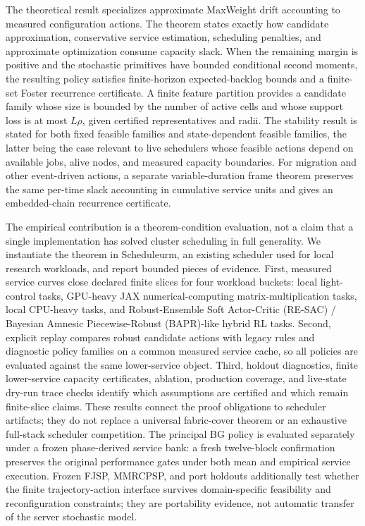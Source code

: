 \documentclass[opre,dblanonrev]{informs4}
\begin{document}
The theoretical result specializes approximate MaxWeight drift accounting to
measured configuration actions.  The theorem states exactly how candidate
approximation, conservative service estimation, scheduling penalties, and
approximate optimization consume capacity slack.  When the remaining margin is
positive and the stochastic primitives have bounded conditional second moments,
the resulting policy satisfies finite-horizon expected-backlog bounds and a
finite-set Foster recurrence certificate.  A finite feature partition provides
a candidate family whose size is bounded by the number of active cells and
whose support loss is at most \(L\rho\), given certified representatives and
radii.  The stability result is
stated for both fixed feasible families and state-dependent feasible families,
the latter being the case relevant to live schedulers whose feasible actions
depend on available jobs, alive nodes, and measured capacity boundaries.
For migration and other event-driven actions, a separate variable-duration
frame theorem preserves the same per-time slack accounting in cumulative
service units and gives an embedded-chain recurrence certificate.

The empirical contribution is a theorem-condition evaluation, not a claim that a
single implementation has solved cluster scheduling in full generality.  We
instantiate the theorem in Scheduleurm, an existing scheduler used for local
research workloads, and report bounded pieces of evidence.  First, measured
service curves close declared finite slices for four workload buckets: local
light-control tasks, GPU-heavy JAX numerical-computing matrix-multiplication
tasks, local CPU-heavy tasks, and Robust-Ensemble Soft Actor-Critic (RE-SAC) /
Bayesian Amnesic Piecewise-Robust (BAPR)-like hybrid RL tasks.  Second,
explicit replay compares robust candidate actions with legacy rules and
diagnostic policy families on a common measured service cache, so all policies
are evaluated against the same lower-service object.  Third, holdout
diagnostics, finite lower-service capacity certificates, ablation, production
coverage, and live-state dry-run trace checks identify which assumptions are
certified and which remain finite-slice claims.  These results connect the
proof obligations to scheduler artifacts; they do not replace a universal
fabric-cover theorem or an exhaustive full-stack scheduler competition.
The principal BG policy is evaluated separately under a frozen phase-derived
service bank: a fresh twelve-block confirmation preserves the original
performance gates under both mean and empirical service execution.
Frozen FJSP, MMRCPSP, and port holdouts additionally test whether the finite
trajectory-action interface survives domain-specific feasibility and
reconfiguration constraints; they are portability evidence, not automatic
transfer of the server stochastic model.
\end{document}

